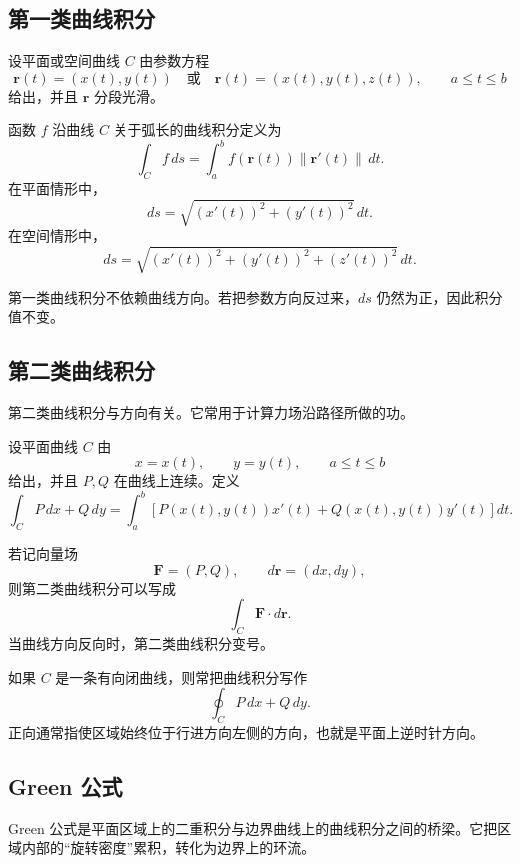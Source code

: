 \subsection{第一类曲线积分}

设平面或空间曲线 $C$ 由参数方程
\[
    \mathbf{r}(t)=(x(t),y(t))
    \quad\text{或}\quad
    \mathbf{r}(t)=(x(t),y(t),z(t)),
    \qquad a\leq t\leq b
\]
给出，并且 $\mathbf{r}$ 分段光滑。

\begin{definition}[对弧长的曲线积分]
函数 $f$ 沿曲线 $C$ 关于弧长的曲线积分定义为
\[
    \int_C f\,ds
    =\int_a^b f(\mathbf{r}(t))\|\mathbf{r}'(t)\|\,dt.
\]
在平面情形中，
\[
    ds=\sqrt{(x'(t))^2+(y'(t))^2}\,dt.
\]
在空间情形中，
\[
    ds=\sqrt{(x'(t))^2+(y'(t))^2+(z'(t))^2}\,dt.
\]
\end{definition}

第一类曲线积分不依赖曲线方向。若把参数方向反过来，$ds$ 仍然为正，因此积分值不变。

\subsection{第二类曲线积分}

第二类曲线积分与方向有关。它常用于计算力场沿路径所做的功。

\begin{definition}[对坐标的曲线积分]
设平面曲线 $C$ 由
\[
    x=x(t),\qquad y=y(t),\qquad a\leq t\leq b
\]
给出，并且 $P,Q$ 在曲线上连续。定义
\[
    \int_C P\,dx+Q\,dy
    =\int_a^b\left[P(x(t),y(t))x'(t)+Q(x(t),y(t))y'(t)\right]dt.
\]
\end{definition}

若记向量场
\[
    \mathbf{F}=(P,Q),
    \qquad
    d\mathbf{r}=(dx,dy),
\]
则第二类曲线积分可以写成
\[
    \int_C \mathbf{F}\cdot d\mathbf{r}.
\]
当曲线方向反向时，第二类曲线积分变号。

\begin{definition}[闭曲线积分]
如果 $C$ 是一条有向闭曲线，则常把曲线积分写作
\[
    \oint_C P\,dx+Q\,dy.
\]
正向通常指使区域始终位于行进方向左侧的方向，也就是平面上逆时针方向。
\end{definition}

\subsection{Green 公式}

Green 公式是平面区域上的二重积分与边界曲线上的曲线积分之间的桥梁。它把区域内部的“旋转密度”累积，转化为边界上的环流。

